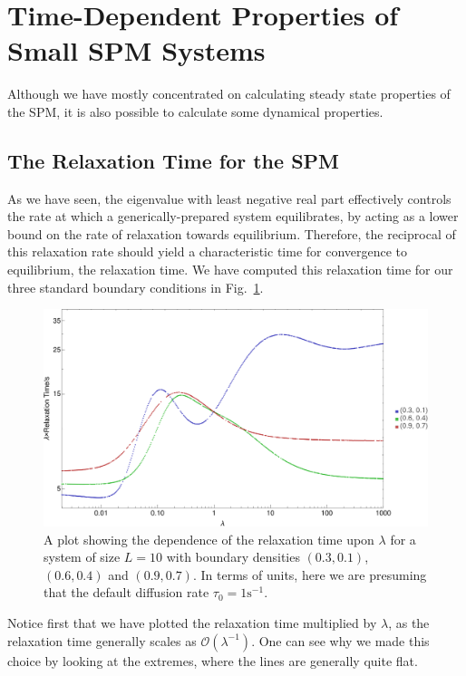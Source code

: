 \section{Time-Dependent Properties of Small SPM Systems}
Although we have mostly concentrated on calculating steady state properties of the SPM, it is also possible to calculate some dynamical properties. 
\subsection{The Relaxation Time for the SPM} \label{sec:relaxTime}
As we have seen, the eigenvalue with least negative real
part effectively controls the rate at which a generically-prepared system equilibrates, by acting as a lower bound on the rate of relaxation towards equilibrium. Therefore, the reciprocal of this 
relaxation rate should yield a characteristic time for convergence to equilibrium, the relaxation
time. We have computed this relaxation time for
our three standard boundary conditions in Fig.~\ref{fig:TRMRelaxTime}.
 \begin{figure}[h!]
 \caption[The dependence of the relaxation time on $\lambda$ for three sets of boundary conditions.]{\label{fig:TRMRelaxTime} 
A plot showing the dependence of the relaxation time upon $\lambda$ for a system of size $L=10$ with
boundary densities $(0.3, 0.1)$, $(0.6, 0.4)$ and $(0.9, 0.7)$. In terms of units, here we are presuming that the default diffusion rate $\tau_0 = 1 \mathrm{s}^{-1}$.
 }
  \begin{center}
 \includegraphics[width=1.0\textwidth]{TRM/images/TRMRelaxTime}
  \end{center}
\end{figure}
Notice first that we have plotted the relaxation time multiplied by $\lambda$, as the relaxation time
generally scales as $\mathcal{O}(\lambda^{-1})$. One can see why we made this choice by looking at the
extremes, where the lines are generally quite flat.

